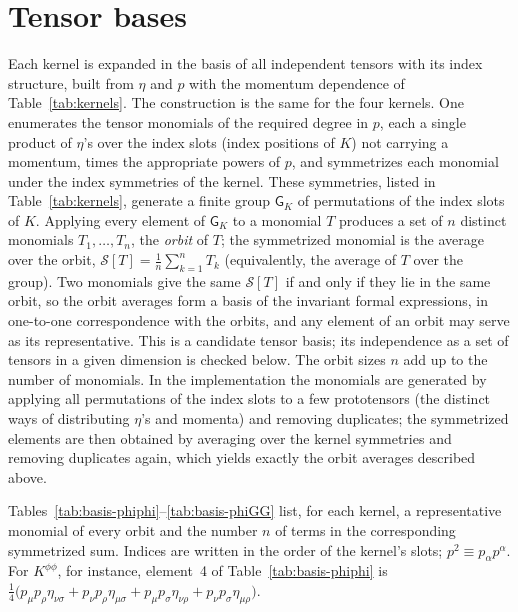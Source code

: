 \documentclass[prd,aps,preprint,superscriptaddress,nofootinbib,amsmath,amssymb,eqsecnum]{revtex4-2}
\providecommand{\DIFaddtex}[1]{{\protect\color{blue} \sf #1}} %
\providecommand{\DIFaddbegin}{} %
\providecommand{\DIFaddend}{} %
\providecommand{\DIFadd}[1]{\texorpdfstring{\DIFaddtex{#1}}{#1}} %
\begin{document}
\section{Tensor bases}
\label{app:bases}

Each kernel is expanded in the basis of all independent tensors with its index structure,
built from $\eta$ and $p$ with the momentum dependence of Table~\ref{tab:kernels}. The
construction is the same for the four kernels. One enumerates the tensor monomials of the
required degree in $p$, each a single product of $\eta$'s over the index slots (index
positions of $K$) not carrying a
momentum, times the appropriate powers of $p$, and symmetrizes each monomial under the
index symmetries of the kernel. These symmetries, listed in Table~\ref{tab:kernels}, generate
a finite group $\mathsf{G}_K$ of permutations of the index slots of $K$. Applying every
element of $\mathsf{G}_K$ to a monomial $T$ produces a set of $n$ distinct monomials
$T_1,\dots,T_n$, the \emph{orbit} of $T$; the symmetrized monomial is the average over the
orbit, $\mathcal{S}[T]=\frac{1}{n}\sum_{k=1}^{n}T_k$ (equivalently, the average of $T$ over the
group). Two monomials give the same $\mathcal{S}[T]$ if and only if they lie in the same
orbit, so the orbit averages form a basis of the invariant formal expressions, in
one-to-one correspondence with the orbits, and any element of an orbit may serve as its
representative. This is a candidate tensor basis; its independence as a set of tensors in a
given dimension is checked below. The orbit sizes $n$ add up to the number of monomials. \DIFaddbegin \DIFadd{In
the implementation the monomials are generated by applying all permutations of the index
slots to a few prototensors (the distinct ways of distributing $\eta$'s and momenta) and
removing duplicates; the symmetrized elements are then obtained by averaging over the
kernel symmetries and removing duplicates again, which yields exactly the orbit averages
described above.
}\DIFaddend 

Tables~\ref{tab:basis-phiphi}--\ref{tab:basis-phiGG} list, for each kernel, a representative
monomial of every orbit and the number $n$ of terms in the corresponding symmetrized sum.
Indices are written in the order of the kernel's slots; $p^2\equiv p_\alpha p^\alpha$. For
$K^{\phi\phi}$, for instance, element~4 of Table~\ref{tab:basis-phiphi} is
$\tfrac14\big(p_\mu p_\rho\eta_{\nu\sigma}+p_\nu p_\rho\eta_{\mu\sigma}
+p_\mu p_\sigma\eta_{\nu\rho}+p_\nu p_\sigma\eta_{\mu\rho}\big)$.
\end{document}
